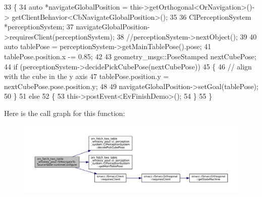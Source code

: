 \begin{DoxyCode}
33         \{
34             \textcolor{keyword}{auto} *navigateGlobalPosition = this->getOrthogonal<OrNavigation>()->
      getClientBehavior<CbNavigateGlobalPosition>();
35 
36             ClPerceptionSystem *perceptionSystem;
37             navigateGlobalPosition->requiresClient(perceptionSystem);
38             \textcolor{comment}{//perceptionSystem->nextObject();}
39 
40             \textcolor{keyword}{auto} tablePose = perceptionSystem->getMainTablePose().pose;
41             tablePose.position.x -= 0.85;
42 
43             geometry\_msgs::PoseStamped nextCubePose;
44             \textcolor{keywordflow}{if} (perceptionSystem->decidePickCubePose(nextCubePose))
45             \{
46                 \textcolor{comment}{// align with the cube in the y axis}
47                 tablePose.position.y = nextCubePose.pose.position.y;
48 
49                 navigateGlobalPosition->setGoal(tablePose);
50             \}
51             \textcolor{keywordflow}{else}
52             \{
53                 this->postEvent<EvFinishDemo>();
54             \}
55         \}
\end{DoxyCode}
Here is the call graph for this function\+:
\nopagebreak
\begin{figure}[H]
\begin{center}
\leavevmode
\includegraphics[width=350pt]{structsm__fetch__two__table__whiskey__pour_1_1StNavigateToSourceTable_a843dcb687e92efc046efbb78da5a1258_cgraph}
\end{center}
\end{figure}
\mbox{\label{structsm__fetch__two__table__whiskey__pour_1_1StNavigateToSourceTable_af2e95f2cad60afa063155b900c1c9c96}} 
